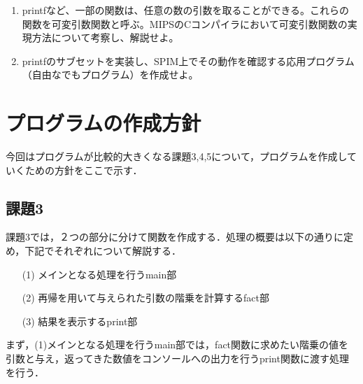 \documentclass[a4j]{jarticle}
\begin{document}
\begin{enumerate}
{\baselineskip 3mm
\begin{verbatim}
int primes_stat[10];
 
char * string_ptr = "ABCDEFG";
char string_ary[] = "ABCDEFG";
 
void print_var(char *name, int val)
{
  print_string(name);
  print_string(" = ");
  print_int(val);
  print_string("\n");
}
 
main()
{
  int primes_auto[10];
 
  primes_stat[0] = 2;
  primes_auto[0] = 3;
 
  print_var("primes_stat[0]", primes_stat[0]);
  print_var("primes_auto[0]", primes_auto[0]);
}
 
\end{verbatim}
}


\item printfなど、一部の関数は、任意の数の引数を取ることができる。これらの関数を可変引数関数と呼ぶ。MIPSのCコンパイラにおいて可変引数関数の実現方法について考察し、解説せよ。

\item printfのサブセットを実装し、SPIM上でその動作を確認する応用プログラム（自由なでもプログラム）を作成せよ。

\end{enumerate}


%
%

\section{プログラムの作成方針}

今回はプログラムが比較的大きくなる課題3,4,5について，プログラムを作成していくための方針をここで示す．

\subsection{課題3}

課題3では，２つの部分に分けて関数を作成する．処理の概要は以下の通りに定め，下記でそれぞれについて解説する．

\begin{itemize}
\item[(1)]メインとなる処理を行うmain部
\item[(2)]再帰を用いて与えられた引数の階乗を計算するfact部
\item[(3)]結果を表示するprint部
\end{itemize}

まず，(1)メインとなる処理を行うmain部では，fact関数に求めたい階乗の値を引数と与え，返ってきた数値をコンソールへの出力を行うprint関数に渡す処理を行う．
\end{document}
